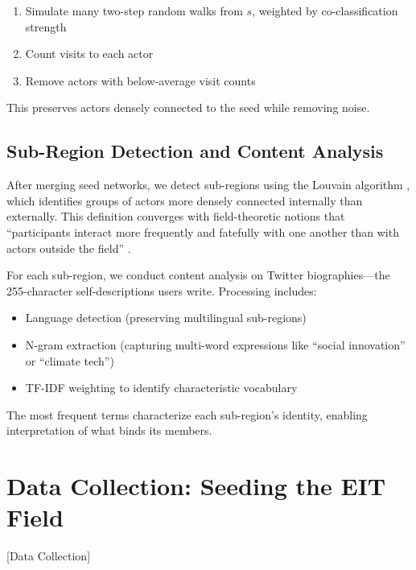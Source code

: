 \documentclass[../main.tex]{subfiles}
\begin{document}
\begin{enumerate}
    \item Simulate many two-step random walks from $s$, weighted by co-classification strength
    \item Count visits to each actor
    \item Remove actors with below-average visit counts
\end{enumerate}

This preserves actors densely connected to the seed while removing noise.


\subsection{Sub-Region Detection and Content Analysis}

After merging seed networks, we detect sub-regions using the Louvain algorithm \cite{blondel2008louvain,fortunato2010community}, which identifies groups of actors more densely connected internally than externally. This definition converges with field-theoretic notions that ``participants interact more frequently and fatefully with one another than with actors outside the field'' \cite{dimaggio1983iron,fligstein2012theory}.

For each sub-region, we conduct content analysis on Twitter biographies---the 255-character self-descriptions users write. Processing includes:

\begin{itemize}
    \item Language detection (preserving multilingual sub-regions)
    \item N-gram extraction (capturing multi-word expressions like ``social innovation'' or ``climate tech'')
    \item TF-IDF weighting to identify characteristic vocabulary
\end{itemize}

The most frequent terms characterize each sub-region's identity, enabling interpretation of what binds its members.


\section{Data Collection: Seeding the EIT Field}[Data Collection]
\end{document}
